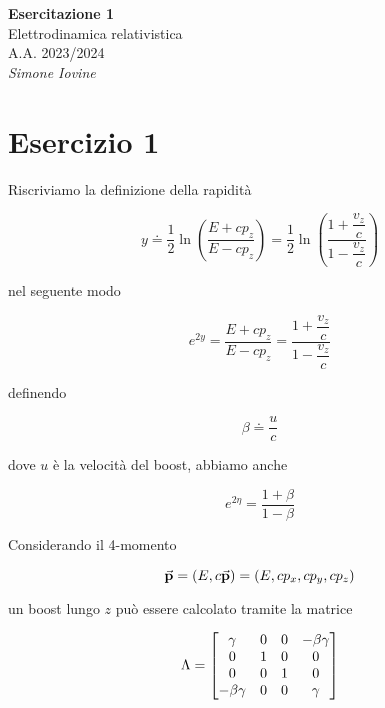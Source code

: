 \documentclass[12pt]{report}
\begin{document}
	

\begin{center}
	{\Large
		\textbf{Esercitazione 1} \\
			Elettrodinamica relativistica \\
			A.A. 2023/2024 \\
			\vspace{0.7cm}
			\textit{Simone Iovine}
		}
\end{center}

\vspace{2cm}

%

\section{Esercizio 1}

Riscriviamo la definizione della rapidità

\begin{equation}
	y \doteq \dfrac{1}{2} \ln(\dfrac{E + c p_{z}}{E - c p_{z}}) %
	= \dfrac{1}{2} \ln(\dfrac{1 + \dfrac{v_{z}}{c}}{1 - \dfrac{v_{z}}{c}})
\end{equation}

nel seguente modo

\begin{equation}
	e^{2 y} = \dfrac{E + c p_{z}}{E - c p_{z}} %
	= \dfrac{1 + \dfrac{v_{z}}{c}}{1 - \dfrac{v_{z}}{c}}
\end{equation}

definendo

\begin{equation}
	\beta \doteq \dfrac{u}{c}
\end{equation}

dove $u$ è la velocità del boost, abbiamo anche

\begin{equation}
	e^{2 \eta} = \dfrac{1 + \beta}{1 - \beta}
\end{equation}

Considerando il 4-momento

\begin{equation}
	\va{p} = (E, c \va{p}) %
	= (E, c p_{x}, c p_{y}, c p_{z})
\end{equation}

un boost lungo $z$ può essere calcolato tramite la matrice

\begin{equation}
	\Lambda = \bmqty{\gamma & 0 & 0 & - \beta \gamma \\
					0 & 1 & 0 & 0 \\
					0 & 0 & 1 & 0 \\
					- \beta \gamma & 0 & 0 & \gamma}
\end{equation}
\end{document}
